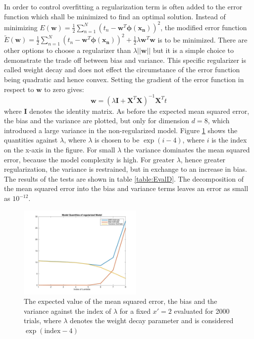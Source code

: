 \documentclass[a4]{article}
\begin{document}
In order to control overfitting a regularization term is often added to the error function which shall be minimized to find an optimal solution. Instead of minimizing $E(\mathbf{w})=\frac{1}{2} \sum_{n=1} ^N (t_n- \mathbf{w}^T \mathbf{\phi}(\mathbf{x_n}))^2$, the modified error function $\tilde{E}(\mathbf{w})=\frac{1}{2} \sum_{n=1} ^N (t_n- \mathbf{w}^T \mathbf{\phi}(\mathbf{x_n}))^2 + \frac{1}{2} \lambda \mathbf{w}^T \mathbf{w}$ is to be minimized. There are other options to choose a regularizer than $\lambda || \mathbf{w} ||$ but it is a simple choice to demonstrate the trade off between bias and variance. This specific regularizer is called weight decay and does not effect the circumstance of the error function being quadratic and hence convex. Setting the gradient of the error function in respect to $\mathbf{w}$ to zero gives:
$$\mathbf{w}=(\lambda \mathbf{I} + \mathbf{X}^T \mathbf{X})^{-1}\mathbf{X}^Tt$$
where $\mathbf{I}$ denotes the identity matrix.
As before the expected mean squared error, the bias and the variance are plotted, but only for dimension $d=8$, which introduced a large variance in the non-regularized model. Figure \ref{fig:Reg} shows the quantities against $\lambda$, where $\lambda$ is chosen to be $\exp (i-4)$, where $i$ is the index on the x-axis in the figure. For small $\lambda$ the variance dominates the mean squared error, because the model complexity is high. For greater $\lambda$, hence greater regularization, the variance is restrained, but in exchange to an increase in bias. The results of the tests are shown in table \ref{table:EvalD}. The decomposition of the mean squared error into the bias and variance terms leaves an error as small as $10^{-12}$.


\begin{figure}[!h]
	\begin{center}
		\centering
		\includegraphics[width=6cm]{../figures/Reg}
	\end{center}
	\caption{\label{fig:Reg}The expected value of the mean squared error, the bias and the variance against the index of $\lambda$ for a fixed $x'=2$ evaluated for 2000 trials, where $\lambda$ denotes the weight decay parameter and is considered $\exp ( \text{index} - 4)$}
\end{figure}
\end{document}
